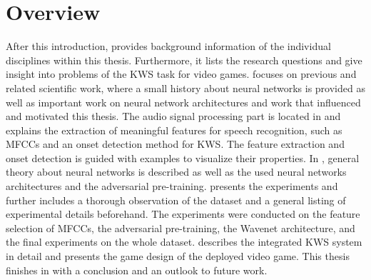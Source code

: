 
\section{Overview}\label{sec:intro_overview}
After this introduction,  provides background information of the individual disciplines within this thesis.
Furthermore, it lists the research questions and give insight into problems of the KWS task for video games.
 focuses on previous and related scientific work, where a small history about neural networks is provided as well as important work on neural network architectures and work that influenced and motivated this thesis.
The audio signal processing part is located in  and explains the extraction of meaningful features for speech recognition, such as MFCCs and an onset detection method for KWS.
The feature extraction and onset detection is guided with examples to visualize their properties.
In , general theory about neural networks is described as well as the used neural networks architectures and the adversarial pre-training.
 presents the experiments and further includes a thorough observation of the dataset and a general listing of experimental details beforehand.
The experiments were conducted on the feature selection of MFCCs, the adversarial pre-training, the Wavenet architecture, and the final experiments on the whole dataset.
 describes the integrated KWS system in detail and presents the game design of the deployed video game.
This thesis finishes in  with a conclusion and an outlook to future work.